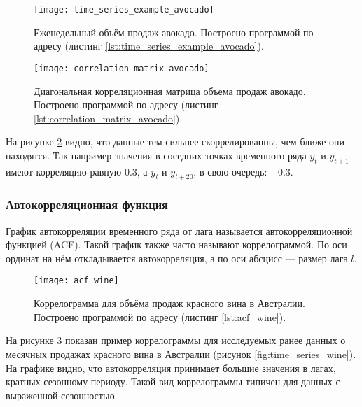 \begin{figure}[h!]
    \centering
    \texttt{[image: time\_series\_example\_avocado]}
    \caption{Еженедельный объём продаж авокадо. Построено программой по адресу 
    (листинг \ref{lst:time_series_example_avocado}).}
    \label{fig:time_series_avocado}
\end{figure}

\begin{figure}[h!]
    \centering
    \texttt{[image: correlation\_matrix\_avocado]}
    \caption{Диагональная корреляционная матрица объема продаж авокадо. Построено 
    программой по адресу (листинг \ref{lst:correlation_matrix_avocado}).}
    \label{fig:correlation_matrix_avocado}
\end{figure}

\newpage

На рисунке \ref{fig:correlation_matrix_avocado} видно, что данные тем сильнее 
скоррелированны, чем ближе они находятся. Так например значения в соседних точках 
временного ряда $y_t$ и $y_{t+1}$ имеют корреляцию равную $0.3$, а $y_t$ и $y_{t+20}$, 
в свою очередь: $-0.3$.

\subsubsection{Автокорреляционная функция}

График автокорреляции временного ряда от лага называется автокорреляционной 
функцией (ACF). Такой график также часто называют коррелограммой. По оси ординат на 
нём откладывается автокорреляция, а по оси абсцисс — размер лага $l$.

\begin{figure}[h!]
    \centering
    \texttt{[image: acf\_wine]}
    \caption{Коррелограмма для объёма продаж красного вина в Австралии. Построено 
    программой по адресу (листинг \ref{lst:acf_wine}).}
    \label{fig:acf_wine}
\end{figure}

На рисунке \ref{fig:acf_wine} показан пример коррелограммы для исследуемых 
ранее данных о месячных продажах красного вина в Австралии 
(рисунок \ref{fig:time_series_wine}). На графике видно, что автокорреляция принимает 
большие значения в лагах, кратных сезонному периоду. Такой вид коррелограммы 
типичен для данных с выраженной сезонностью.

